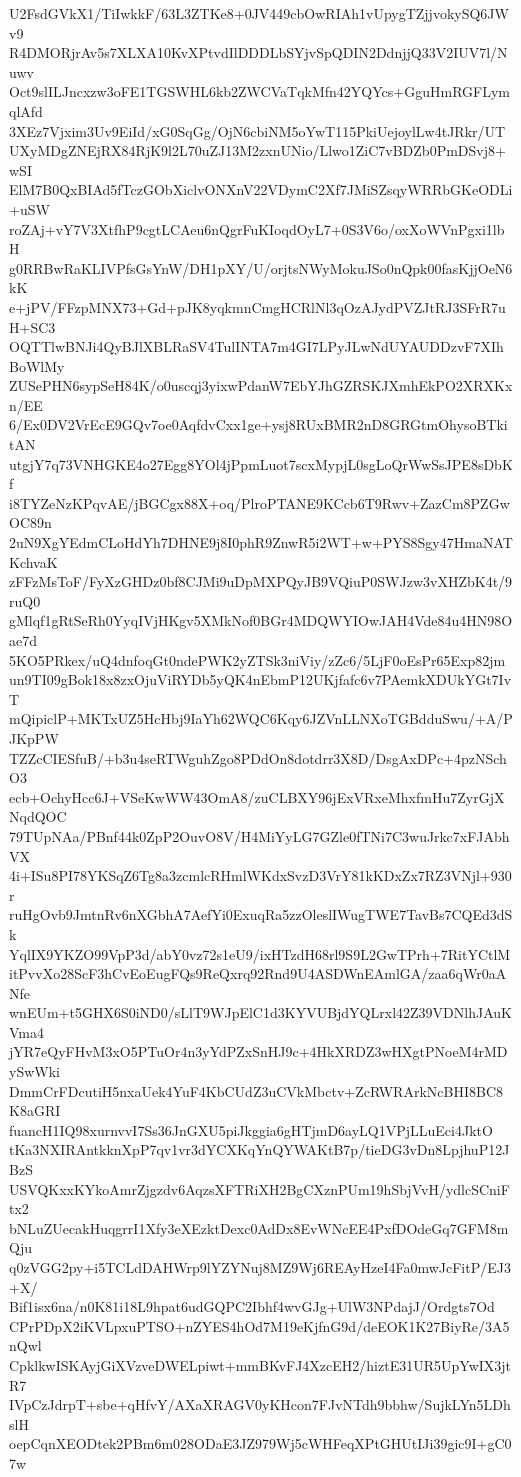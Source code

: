 U2FsdGVkX1/TiIwkkF/63L3ZTKe8+0JV449cbOwRIAh1vUpygTZjjvokySQ6JWv9
R4DMORjrAv5s7XLXA10KvXPtvdIlDDDLbSYjvSpQDIN2DdnjjQ33V2IUV7l/Nuwv
Oct9slILJncxzw3oFE1TGSWHL6kb2ZWCVaTqkMfn42YQYcs+GguHmRGFLymqlAfd
3XEz7Vjxim3Uv9EiId/xG0SqGg/OjN6cbiNM5oYwT115PkiUejoylLw4tJRkr/UT
UXyMDgZNEjRX84RjK9l2L70uZJ13M2zxnUNio/Llwo1ZiC7vBDZb0PmDSvj8+wSI
ElM7B0QxBIAd5fTczGObXiclvONXnV22VDymC2Xf7JMiSZsqyWRRbGKeODLi+uSW
roZAj+vY7V3XtfhP9cgtLCAeu6nQgrFuKIoqdOyL7+0S3V6o/oxXoWVnPgxi1lbH
g0RRBwRaKLIVPfsGsYnW/DH1pXY/U/orjtsNWyMokuJSo0nQpk00fasKjjOeN6kK
e+jPV/FFzpMNX73+Gd+pJK8yqkmnCmgHCRlNl3qOzAJydPVZJtRJ3SFrR7uH+SC3
OQTTlwBNJi4QyBJlXBLRaSV4TulINTA7m4GI7LPyJLwNdUYAUDDzvF7XIhBoWlMy
ZUSePHN6sypSeH84K/o0uscqj3yixwPdanW7EbYJhGZRSKJXmhEkPO2XRXKxn/EE
6/Ex0DV2VrEcE9GQv7oe0AqfdvCxx1ge+ysj8RUxBMR2nD8GRGtmOhysoBTkitAN
utgjY7q73VNHGKE4o27Egg8YOl4jPpmLuot7scxMypjL0sgLoQrWwSsJPE8sDbKf
i8TYZeNzKPqvAE/jBGCgx88X+oq/PlroPTANE9KCcb6T9Rwv+ZazCm8PZGwOC89n
2uN9XgYEdmCLoHdYh7DHNE9j8I0phR9ZnwR5i2WT+w+PYS8Sgy47HmaNATKchvaK
zFFzMsToF/FyXzGHDz0bf8CJMi9uDpMXPQyJB9VQiuP0SWJzw3vXHZbK4t/9ruQ0
gMlqf1gRtSeRh0YyqIVjHKgv5XMkNof0BGr4MDQWYIOwJAH4Vde84u4HN98Oae7d
5KO5PRkex/uQ4dnfoqGt0ndePWK2yZTSk3niViy/zZc6/5LjF0oEsPr65Exp82jm
un9TI09gBok18x8zxOjuViRYDb5yQK4nEbmP12UKjfafc6v7PAemkXDUkYGt7IvT
mQipiclP+MKTxUZ5HcHbj9IaYh62WQC6Kqy6JZVnLLNXoTGBdduSwu/+A/PJKpPW
TZZcCIESfuB/+b3u4seRTWguhZgo8PDdOn8dotdrr3X8D/DsgAxDPc+4pzNSchO3
ecb+OchyHcc6J+VSeKwWW43OmA8/zuCLBXY96jExVRxeMhxfmHu7ZyrGjXNqdQOC
79TUpNAa/PBnf44k0ZpP2OuvO8V/H4MiYyLG7GZle0fTNi7C3wuJrkc7xFJAbhVX
4i+ISu8PI78YKSqZ6Tg8a3zcmlcRHmlWKdxSvzD3VrY81kKDxZx7RZ3VNjl+930r
ruHgOvb9JmtnRv6nXGbhA7AefYi0ExuqRa5zzOleslIWugTWE7TavBs7CQEd3dSk
YqlIX9YKZO99VpP3d/abY0vz72s1eU9/ixHTzdH68rl9S9L2GwTPrh+7RitYCtlM
itPvvXo28ScF3hCvEoEugFQs9ReQxrq92Rnd9U4ASDWnEAmlGA/zaa6qWr0aANfe
wnEUm+t5GHX6S0iND0/sLlT9WJpElC1d3KYVUBjdYQLrxl42Z39VDNlhJAuKVma4
jYR7eQyFHvM3xO5PTuOr4n3yYdPZxSnHJ9c+4HkXRDZ3wHXgtPNoeM4rMDySwWki
DmmCrFDcutiH5nxaUek4YuF4KbCUdZ3uCVkMbctv+ZcRWRArkNcBHI8BC8K8aGRI
fuancH1IQ98xurnvvI7Ss36JnGXU5piJkggia6gHTjmD6ayLQ1VPjLLuEci4JktO
tKa3NXIRAntkknXpP7qv1vr3dYCXKqYnQYWAKtB7p/tieDG3vDn8LpjhuP12JBzS
USVQKxxKYkoAmrZjgzdv6AqzsXFTRiXH2BgCXznPUm19hSbjVvH/ydlcSCniFtx2
bNLuZUecakHuqgrrI1Xfy3eXEzktDexc0AdDx8EvWNcEE4PxfDOdeGq7GFM8mQju
q0zVGG2py+i5TCLdDAHWrp9lYZYNuj8MZ9Wj6REAyHzeI4Fa0mwJcFitP/EJ3+X/
Bif1isx6na/n0K81i18L9hpat6udGQPC2Ibhf4wvGJg+UlW3NPdajJ/Ordgts7Od
CPrPDpX2iKVLpxuPTSO+nZYES4hOd7M19eKjfnG9d/deEOK1K27BiyRe/3A5nQwl
CpklkwISKAyjGiXVzveDWELpiwt+mmBKvFJ4XzcEH2/hiztE31UR5UpYwIX3jtR7
IVpCzJdrpT+sbe+qHfvY/AXaXRAGV0yKHcon7FJvNTdh9bbhw/SujkLYn5LDhslH
oepCqnXEODtek2PBm6m028ODaE3JZ979Wj5cWHFeqXPtGHUtIJi39gic9I+gC07w
